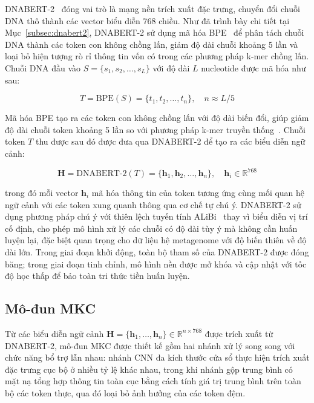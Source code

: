 DNABERT-2~\cite{zhou2023dnabert} đóng vai trò là mạng nền trích xuất đặc trưng, chuyển đổi chuỗi DNA thô thành các vector biểu diễn 768 chiều. Như đã trình bày chi tiết tại Mục~\ref{subsec:dnabert2}, DNABERT-2 sử dụng mã hóa BPE~\cite{sennrich2015neural} để phân tách chuỗi DNA thành các token con không chồng lấn, giảm độ dài chuỗi khoảng 5 lần và loại bỏ hiện tượng rò rỉ thông tin vốn có trong các phương pháp k-mer chồng lấn. Chuỗi DNA đầu vào $S = \{s_1, s_2, \ldots, s_L\}$ với độ dài $L$ nucleotide được mã hóa như sau:

\begin{equation}
    T = \text{BPE}(S) = \{t_1, t_2, \ldots, t_n\}, \quad n \approx L/5
    \label{eq:bpe_tokenization}
\end{equation}

Mã hóa BPE tạo ra các token con không chồng lấn với độ dài biến đổi, giúp giảm độ dài chuỗi token khoảng 5 lần so với phương pháp k-mer truyền thống~\cite{zhou2023dnabert}. Chuỗi token $T$ thu được sau đó được đưa qua DNABERT-2 để tạo ra các biểu diễn ngữ cảnh:

\begin{equation}
    \mathbf{H} = \text{DNABERT-2}(T) = \{\mathbf{h}_1, \mathbf{h}_2, \ldots, \mathbf{h}_n\}, \quad \mathbf{h}_i \in \mathbb{R}^{768}
    \label{eq:dnabert2_encoding}
\end{equation}

\noindent trong đó mỗi vector $\mathbf{h}_i$ mã hóa thông tin của token tương ứng cùng mối quan hệ ngữ cảnh với các token xung quanh thông qua cơ chế tự chú ý. DNABERT-2 sử dụng phương pháp chú ý với thiên lệch tuyến tính ALiBi~\cite{press2021train} thay vì biểu diễn vị trí cố định, cho phép mô hình xử lý các chuỗi có độ dài tùy ý mà không cần huấn luyện lại, đặc biệt quan trọng cho dữ liệu hệ metagenome với độ biến thiên về độ dài lớn. Trong giai đoạn khởi động, toàn bộ tham số của DNABERT-2 được đóng băng; trong giai đoạn tinh chỉnh, mô hình nền được mở khóa và cập nhật với tốc độ học thấp để bảo toàn tri thức tiền huấn luyện.

\subsection{Mô-đun MKC}

Từ các biểu diễn ngữ cảnh $\mathbf{H} = \{\mathbf{h}_1, \ldots, \mathbf{h}_n\} \in \mathbb{R}^{n \times 768}$ được trích xuất từ DNABERT-2, mô-đun MKC được thiết kế gồm hai nhánh xử lý song song với chức năng bổ trợ lẫn nhau: nhánh CNN đa kích thước cửa sổ thực hiện trích xuất đặc trưng cục bộ ở nhiều tỷ lệ khác nhau, trong khi nhánh gộp trung bình có mặt nạ tổng hợp thông tin toàn cục bằng cách tính giá trị trung bình trên toàn bộ các token thực, qua đó loại bỏ ảnh hưởng của các token đệm.

